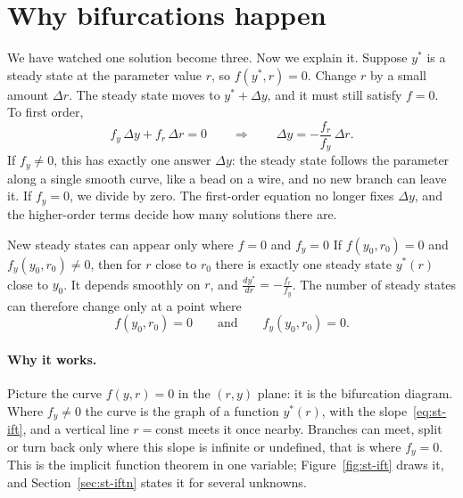 \section{Why bifurcations happen}\label{sec:st-why}
%

We have watched one solution become three. Now we explain it. Suppose $y^*$ is a
steady state at the parameter value $r$, so $f(y^*,r) = 0$. Change $r$ by a small
amount $\Delta r$. The steady state moves to $y^* + \Delta y$, and it must still
satisfy $f = 0$. To first order,
\begin{equation}\label{eq:st-ift}
  f_y\,\Delta y + f_r\,\Delta r = 0
  \qquad\Longrightarrow\qquad
  \Delta y = -\frac{f_r}{f_y}\,\Delta r .
\end{equation}
If $f_y \neq 0$, this has exactly one answer $\Delta y$: the steady state follows
the parameter along a single smooth curve, like a bead on a wire, and no new
branch can leave it. If $f_y = 0$, we divide by zero. The first-order equation no
longer fixes $\Delta y$, and the higher-order terms decide how many solutions
there are.

\begin{gbox}{New steady states can appear only where $f = 0$ and $f_y = 0$}\label{sec:st-ift}
%
If $f(y_0,r_0) = 0$ and $f_y(y_0,r_0) \neq 0$, then for $r$ close to $r_0$ there
is exactly one steady state $y^*(r)$ close to $y_0$. It depends smoothly on $r$,
and $\displaystyle\frac{dy^*}{dr} = -\frac{f_r}{f_y}$. The number of steady states
can therefore change only at a point where
\begin{equation}\label{eq:st-bifcondition}
  f(y_0,r_0) = 0 \qquad\text{and}\qquad f_y(y_0,r_0) = 0 .
\end{equation}
\end{gbox}

\paragraph{Why it works.}
Picture the curve $f(y,r) = 0$ in the $(r,y)$ plane: it is the bifurcation
diagram. Where $f_y \neq 0$ the curve is the graph of a function $y^*(r)$, with
the slope~\eqref{eq:st-ift}, and a vertical line $r = \text{const}$ meets it once
nearby. Branches can meet, split or turn back only where this slope is
infinite or undefined, that is where $f_y = 0$. This is the implicit function
theorem in one variable; Figure~\ref{fig:st-ift} draws it, and
Section~\ref{sec:st-iftn} states it for several unknowns.

